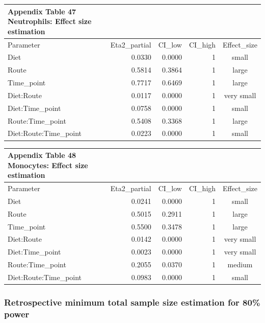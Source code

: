 \documentclass[
  12pt,
  letterpaper,
]{article}
\begin{document}
\begingroup
\fontsize{12.0pt}{14.4pt}\selectfont
\begin{longtable}{lrrrc}
\caption*{
{\large \textbf{Appendix Table 47}} \\ 
{\small \textbf{Neutrophils: Effect size estimation}}
} \\ 
\toprule
Parameter & Eta2\_partial & CI\_low & CI\_high & Effect\_size \\ 
\midrule\addlinespace[2.5pt]
Diet & 0.0330 & 0.0000 & 1 & small \\ 
Route & 0.5814 & 0.3864 & 1 & large \\ 
Time\_point & 0.7717 & 0.6469 & 1 & large \\ 
Diet:Route & 0.0117 & 0.0000 & 1 & very small \\ 
Diet:Time\_point & 0.0758 & 0.0000 & 1 & small \\ 
Route:Time\_point & 0.5408 & 0.3368 & 1 & large \\ 
Diet:Route:Time\_point & 0.0223 & 0.0000 & 1 & small \\ 
\bottomrule
\end{longtable}
\endgroup

\begingroup
\fontsize{12.0pt}{14.4pt}\selectfont
\begin{longtable}{lrrrc}
\caption*{
{\large \textbf{Appendix Table 48}} \\ 
{\small \textbf{Monocytes: Effect size estimation}}
} \\ 
\toprule
Parameter & Eta2\_partial & CI\_low & CI\_high & Effect\_size \\ 
\midrule\addlinespace[2.5pt]
Diet & 0.0241 & 0.0000 & 1 & small \\ 
Route & 0.5015 & 0.2911 & 1 & large \\ 
Time\_point & 0.5500 & 0.3478 & 1 & large \\ 
Diet:Route & 0.0142 & 0.0000 & 1 & very small \\ 
Diet:Time\_point & 0.0023 & 0.0000 & 1 & very small \\ 
Route:Time\_point & 0.2055 & 0.0370 & 1 & medium \\ 
Diet:Route:Time\_point & 0.0983 & 0.0000 & 1 & small \\ 
\bottomrule
\end{longtable}
\endgroup

\subsubsection{Retrospective minimum total sample size estimation for 80\% power}\label{retrospective-minimum-total-sample-size-estimation-for-80-power-1}
\end{document}
